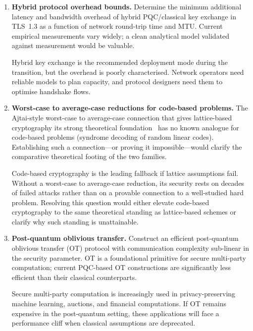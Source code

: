 \begin{enumerate}
The history of cryptographic implementation is littered with bugs that formal methods could have caught---Heartbleed, Lucky~13, countless timing side channels.  A verified reference implementation would not only prevent such bugs but would serve as a trusted baseline against which other implementations can be validated.

\item \textbf{Hybrid protocol overhead bounds.}
Determine the minimum additional latency and bandwidth overhead of hybrid PQC/classical key exchange in TLS~1.3 as a function of network round-trip time and MTU.  Current empirical measurements vary widely; a clean analytical model validated against measurement would be valuable.

Hybrid key exchange is the recommended deployment mode during the transition, but the overhead is poorly characterised.  Network operators need reliable models to plan capacity, and protocol designers need them to optimise handshake flows.

\item \textbf{Worst-case to average-case reductions for code-based problems.}
The Ajtai-style worst-case to average-case connection that gives lattice-based cryptography its strong theoretical foundation~\cite{MicciancioGoldwasser2002} has no known analogue for code-based problems (syndrome decoding of random linear codes).  Establishing such a connection---or proving it impossible---would clarify the comparative theoretical footing of the two families.

Code-based cryptography is the leading fallback if lattice assumptions fail.  Without a worst-case to average-case reduction, its security rests on decades of failed attacks rather than on a provable connection to a well-studied hard problem.  Resolving this question would either elevate code-based cryptography to the same theoretical standing as lattice-based schemes or clarify why such standing is unattainable.

\item \textbf{Post-quantum oblivious transfer.}
Construct an efficient post-quantum oblivious transfer (OT) protocol with communication complexity sub-linear in the security parameter.  OT is a foundational primitive for secure multi-party computation; current PQC-based OT constructions are significantly less efficient than their classical counterparts.

Secure multi-party computation is increasingly used in privacy-preserving machine learning, auctions, and financial computations.  If OT remains expensive in the post-quantum setting, these applications will face a performance cliff when classical assumptions are deprecated.


\end{enumerate}
